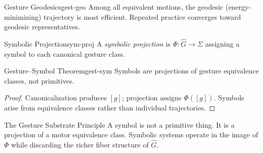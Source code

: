 \begin{theorem}{Gesture Geodesics}{gest-geo}
  Among all equivalent motions, the geodesic (energy-minimizing)
  trajectory is most efficient. Repeated practice converges toward
  geodesic representatives.
\end{theorem}

\begin{definition}{Symbolic Projection}{sym-proj}
  A \emph{symbolic projection} is $\Phi : \hat{G} \to \Sigma$
  assigning a symbol to each canonical gesture class.
\end{definition}

\begin{theorem}{Gesture–Symbol Theorem}{gest-sym}
  Symbols are projections of gesture equivalence classes, not primitives.
\end{theorem}
\begin{proof}
  Canonicalization produces $[g]$; projection assigns $\Phi([g])$.
  Symbols arise from equivalence classes rather than individual trajectories.
\end{proof}

\begin{namedthm}{The Gesture Substrate Principle}
  A symbol is not a primitive thing. It is a projection of a motor
  equivalence class. Symbolic systems operate in the image of $\Phi$
  while discarding the richer fiber structure of $\hat{G}$.
\end{namedthm}
